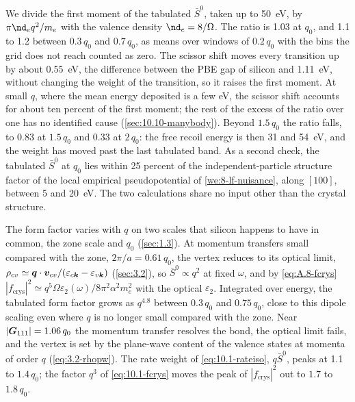 We divide the first moment of the tabulated $\bar S^0$, taken up to \SI{50}{eV}, by $\pi\nd_eq^2/m_e$ with the valence density $\nd_e = 8/\Omega$. The ratio is 1.03 at $q_0$, and 1.1 to 1.2 between $0.3\,q_0$ and $0.7\,q_0$, as means over windows of $0.2\,q_0$ with the bins the grid does not reach counted as zero. The scissor shift moves every transition up by about \SI{0.55}{eV}, the difference between the PBE gap of silicon and \SI{1.11}{eV}, without changing the weight of the transition, so it raises the first moment. At small $q$, where the mean energy deposited is a few eV, the scissor shift accounts for about ten percent of the first moment; the rest of the excess of the ratio over one has no identified cause (\cref{sec:10.10-manybody}). Beyond $1.5\,q_0$ the ratio falls, to 0.83 at $1.5\,q_0$ and 0.33 at $2\,q_0$: the free recoil energy is then 31 and \SI{54}{eV}, and the weight has moved past the last tabulated band. As a second check, the tabulated $\bar S^0$ at $q_0$ lies within 25 percent of the independent-particle structure factor of the local empirical pseudopotential of \cref{we:8-lf-nuisance}, along $[100]$, between 5 and \SI{20}{eV}. The two calculations share no input other than the crystal structure.

The form factor varies with $q$ on two scales that silicon happens to have in common, the zone scale and $q_0$ (\cref{sec:1.3}). At momentum transfers small compared with the zone, $2\pi/a = 0.61\,q_0$, the vertex reduces to its optical limit, $\rho_{cv} \simeq \bm{q}\cdot\bm{v}_{cv}/(\varepsilon_{c\bm{k}} - \varepsilon_{v\bm{k}})$ (\cref{sec:3.2}), so $\bar S^0 \propto q^2$ at fixed $\omega$, and by \cref{eq:A.8-fcrys} $|f_{\mathrm{crys}}|^2 \simeq q^5\Omega\varepsilon_2(\omega)/8\pi^2\alpha^2m_e^2$ with the optical $\varepsilon_2$. Integrated over energy, the tabulated form factor grows as $q^{4.8}$ between $0.3\,q_0$ and $0.75\,q_0$, close to this dipole scaling even where $q$ is no longer small compared with the zone. Near $|\bm{G}_{111}| = 1.06\,q_0$ the momentum transfer resolves the bond, the optical limit fails, and the vertex is set by the plane-wave content of the valence states at momenta of order $q$ (\cref{eq:3.2-rhopw}). The rate weight of \cref{eq:10.1-rateiso}, $q\bar S^0$, peaks at 1.1 to $1.4\,q_0$; the factor $q^3$ of \cref{eq:10.1-fcrys} moves the peak of $|f_{\mathrm{crys}}|^2$ out to $1.7$ to $1.8\,q_0$.

